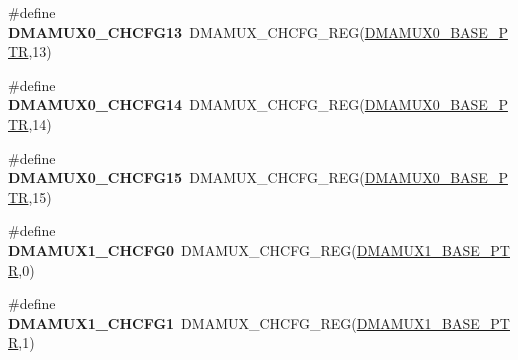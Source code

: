 \begin{DoxyCompactItemize}
\item 
\hypertarget{group___d_m_a_m_u_x___register___accessor___macros_ga58a65253102475bd8ad93f45485fbd21}{}\#define {\bfseries D\+M\+A\+M\+U\+X0\+\_\+\+C\+H\+C\+F\+G13}~D\+M\+A\+M\+U\+X\+\_\+\+C\+H\+C\+F\+G\+\_\+\+R\+E\+G(\hyperlink{group___d_m_a_m_u_x___peripheral_ga403b61d306820e4e1113c636300004a3}{D\+M\+A\+M\+U\+X0\+\_\+\+B\+A\+S\+E\+\_\+\+P\+T\+R},13)\label{group___d_m_a_m_u_x___register___accessor___macros_ga58a65253102475bd8ad93f45485fbd21}

\item 
\hypertarget{group___d_m_a_m_u_x___register___accessor___macros_ga3dbeded86e158b240cc798c757560fcb}{}\#define {\bfseries D\+M\+A\+M\+U\+X0\+\_\+\+C\+H\+C\+F\+G14}~D\+M\+A\+M\+U\+X\+\_\+\+C\+H\+C\+F\+G\+\_\+\+R\+E\+G(\hyperlink{group___d_m_a_m_u_x___peripheral_ga403b61d306820e4e1113c636300004a3}{D\+M\+A\+M\+U\+X0\+\_\+\+B\+A\+S\+E\+\_\+\+P\+T\+R},14)\label{group___d_m_a_m_u_x___register___accessor___macros_ga3dbeded86e158b240cc798c757560fcb}

\item 
\hypertarget{group___d_m_a_m_u_x___register___accessor___macros_ga054ba8df130cbe8ff1e34c4056857af2}{}\#define {\bfseries D\+M\+A\+M\+U\+X0\+\_\+\+C\+H\+C\+F\+G15}~D\+M\+A\+M\+U\+X\+\_\+\+C\+H\+C\+F\+G\+\_\+\+R\+E\+G(\hyperlink{group___d_m_a_m_u_x___peripheral_ga403b61d306820e4e1113c636300004a3}{D\+M\+A\+M\+U\+X0\+\_\+\+B\+A\+S\+E\+\_\+\+P\+T\+R},15)\label{group___d_m_a_m_u_x___register___accessor___macros_ga054ba8df130cbe8ff1e34c4056857af2}

\item 
\hypertarget{group___d_m_a_m_u_x___register___accessor___macros_ga69bca341f077ef07cd586e62d9b3576f}{}\#define {\bfseries D\+M\+A\+M\+U\+X1\+\_\+\+C\+H\+C\+F\+G0}~D\+M\+A\+M\+U\+X\+\_\+\+C\+H\+C\+F\+G\+\_\+\+R\+E\+G(\hyperlink{group___d_m_a_m_u_x___peripheral_gad6b43366c6448bd157f17be565d8e1f3}{D\+M\+A\+M\+U\+X1\+\_\+\+B\+A\+S\+E\+\_\+\+P\+T\+R},0)\label{group___d_m_a_m_u_x___register___accessor___macros_ga69bca341f077ef07cd586e62d9b3576f}

\item 
\hypertarget{group___d_m_a_m_u_x___register___accessor___macros_gab5acc8731d28c925aad483949f37ce8f}{}\#define {\bfseries D\+M\+A\+M\+U\+X1\+\_\+\+C\+H\+C\+F\+G1}~D\+M\+A\+M\+U\+X\+\_\+\+C\+H\+C\+F\+G\+\_\+\+R\+E\+G(\hyperlink{group___d_m_a_m_u_x___peripheral_gad6b43366c6448bd157f17be565d8e1f3}{D\+M\+A\+M\+U\+X1\+\_\+\+B\+A\+S\+E\+\_\+\+P\+T\+R},1)\label{group___d_m_a_m_u_x___register___accessor___macros_gab5acc8731d28c925aad483949f37ce8f}


\end{DoxyCompactItemize}
